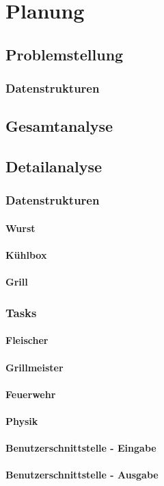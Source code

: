 \chapter{Planung}

\section{Problemstellung}

\subsection{Datenstrukturen}

\section{Gesamtanalyse}

\section{Detailanalyse}

\subsection{Datenstrukturen}

\subsubsection{Wurst}

\subsubsection{Kühlbox}

\subsubsection{Grill}

\subsection{Tasks}

\subsubsection{Fleischer}

\subsubsection{Grillmeister}

\subsubsection{Feuerwehr}

\subsubsection{Physik}

\subsubsection{Benutzerschnittstelle - Eingabe}

\subsubsection{Benutzerschnittstelle - Ausgabe}

